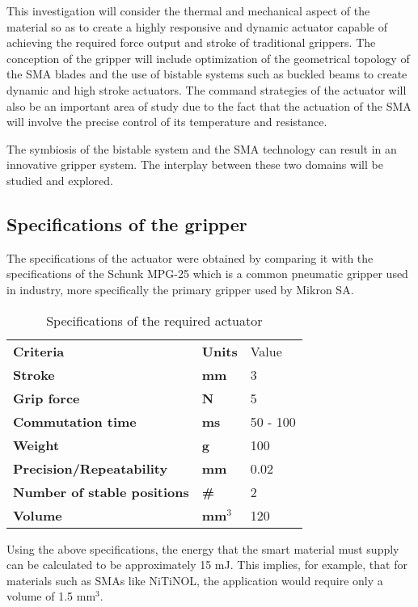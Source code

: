 This investigation will consider the thermal and mechanical aspect of the material so as to create a highly responsive and dynamic actuator capable of achieving the required force output and stroke of traditional grippers. The conception of the gripper will include optimization of the geometrical topology of the SMA blades and the use of bistable systems such as buckled beams to create dynamic and high stroke actuators. The command strategies of the actuator will also be an important area of study due to the fact that the actuation of the SMA will involve the precise control of its temperature and resistance.

The symbiosis of the bistable system and the SMA technology can result in an innovative gripper system. The interplay between these two domains will be studied and explored.

\subsection{Specifications of the gripper}\label{subsec:specifications}
The specifications of the actuator were obtained by comparing it with the specifications of the Schunk MPG-25 which is a common pneumatic gripper used in industry, more specifically the primary gripper used by Mikron SA.

\begin{table}[H]%
  \centering
  \footnotesize
  \caption{Specifications of the required actuator}
  \label{tab:specs}
  \begin{tabu} to 0.5
      Criteria & Units & Value\\
      Stroke & mm & 3\\
      Grip force & N & 5\\
      Commutation time & ms & 50 - 100\\
      Weight & g & 100\\
      Precision/Repeatability & mm & 0.02\\
      Number of stable positions & \# & 2\\
      Volume & mm$^3$ & 120 \\
  \end{tabu}
\end{table}

Using the above specifications, the energy that the smart material must supply can be calculated to be approximately 15 mJ. This implies, for example, that for materials such as SMAs like NiTiNOL, the application would require only a volume of 1.5 mm$^3$.
